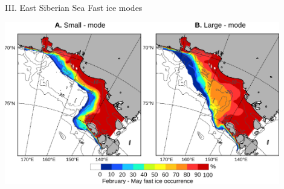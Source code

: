\documentclass[8pt]{beamer}
\begin{document}
\setwatermark{\fontsize{125pt}{125pt}\selectfont{}}
\begin{frame}[fragile]{III. East Siberian Sea Fast ice modes}
\begin{center}
	\includegraphics[width=0.9\textwidth]{./img/ESS_modes.png}
\end{center}
\end{frame}
\end{document}
